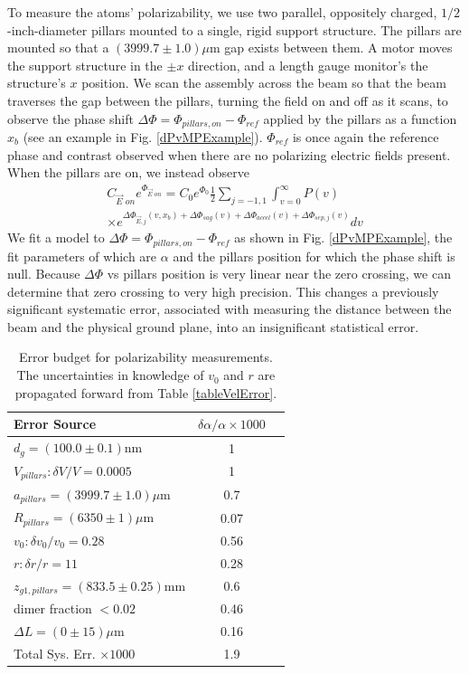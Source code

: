 \documentclass[twocolumn,prl,showpacs,superscriptaddress]{revtex4-1}   %
\newcommand{\figref}[1]{Fig. \ref{#1}}
\newcommand{\sigv}{0.28}
\newcommand{\sigr}{11}
\begin{document}
To measure the atoms' polarizability, we use two parallel, oppositely charged, $1/2$-inch-diameter pillars mounted to a single, rigid support structure. The pillars are mounted so that a $(3999.7 \pm 1.0)\mu$m gap exists between them. A motor moves the support structure in the $\pm x$ direction, and a length gauge monitor's the structure's $x$ position. We scan the assembly across the beam so that the beam traverses the gap between the pillars, turning the field on and off as it scans, to observe the phase shift $\Delta\Phi = \Phi_{pillars,on} - \Phi_{ref}$ applied by the pillars as a function $x_b$ (see an example in \figref{dPvMPExample}). $\Phi_{ref}$ is once again the reference phase and contrast observed when there are no polarizing electric fields present.
When the pillars are on, we instead observe
\begin{align}
	C_{\vec{E}\textit{ on}}e^{\Phi_{\vec{E}\textit{ on}}} = 
		C_0e^{\Phi_0}		
		\frac{1}{2} \sum_{j=-1,1}
		\int_{v=0}^{\infty} P(v) \nonumber \\ \times
		e^{
			\Delta\Phi_{\vec{E},j}(v,x_b) + 
			\Delta\Phi_{sag}(v) + \Delta\Phi_{accel}(v) + \Delta\Phi_{sep,j}(v)
		} 
		dv
	\label{CPPolesEOn}
\end{align}
We fit a model to $\Delta\Phi = \Phi_{pillars,on} - \Phi_{ref}$ as shown in \figref{dPvMPExample}, the fit parameters of which are $\alpha$ and the pillars position for which the phase shift is null. Because $\Delta\Phi$ vs pillars position is very linear near the zero crossing, we can determine that zero crossing to very high precision. 
This changes a previously significant systematic error, associated with measuring the distance between the beam and the physical ground plane, into an insignificant statistical error.

\begingroup
\begin{table}
\caption{\label{tablePolError}Error budget for polarizability measurements. The uncertainties in knowledge of $v_0$ and $r$ are propagated forward from Table \ref{tableVelError}.}
\begin{center}
\begin{tabular}{l c c}
\hline\hline
Error Source & $\delta\alpha/\alpha \times 1000$ \\
\hline
$d_g = (100.0 \pm 0.1) \mathrm{nm}$ 		& 1 \\
$V_{pillars}: \delta V/V = 0.0005$ 		& 1 \\
$a_{pillars} = (3999.7 \pm 1.0) \mu\mathrm{m}$ 		& 0.7 \\
$R_{pillars} = (6350 \pm 1) \mu\mathrm{m}$ 		& 0.07 \\
$v_0: \delta v_0/v_0 = \sigv$		& 0.56 \\
$r: \delta r/r = \sigr$ 		& 0.28 \\
$z_{g1,pillars} = (833.5 \pm 0.25) \mathrm{mm}$ 		& 0.6 \\
dimer fraction $ < 0.02$ 		& 0.46 \\
$\Delta L = (0 \pm 15) \mu\mathrm{m}$ 		& 0.16 \\
\hline
Total Sys. Err. $\times 1000$ & 1.9 \\
\hline\hline
\end{tabular}
\end{center}
\end{table}
\endgroup
\end{document}
